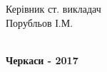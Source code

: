 \documentclass[../main.tex]{subfiles}
\begin{document}
\begin{titlepage}
{\begin{flushright}
\begin{minipage}[t]{4.2cm}
\begin{flushright}
				\end{flushright}
			\end{minipage}
		\end{flushright}
		\begin{flushright}
			\begin{minipage}[t]{6.8cm}
				\begin{flushright}
					Керівник ст. викладач \\
					Порубльов І.М. \\
					\hrulefill \\
				\end{flushright}
			\end{minipage}
		\end{flushright}
    }
    \vfill
    \vfill
    {\centering\bfseries Черкаси - 2017 \\ }
\end{titlepage}
\end{document}

